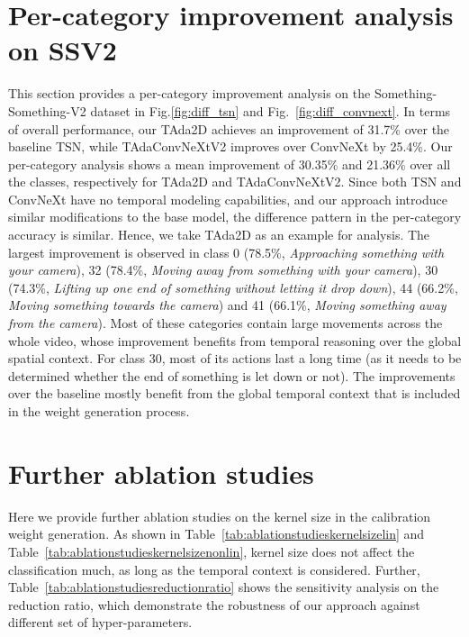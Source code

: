 \documentclass[10pt,journal,compsoc]{IEEEtran}
\begin{document}
\section{Per-category improvement analysis on SSV2}
\label{appendix:percategoryimprovement}
This section provides a per-category improvement analysis on the Something-Something-V2 dataset in Fig.\ref{fig:diff_tsn} and Fig.~\ref{fig:diff_convnext}.
In terms of overall performance, our TAda2D achieves an improvement of 31.7\% over the baseline TSN, while TAdaConvNeXtV2 improves over ConvNeXt by 25.4\%. 
Our per-category analysis shows a mean improvement of 30.35\% and 21.36\% over all the classes, respectively for TAda2D and TAdaConvNeXtV2. 
Since both TSN and ConvNeXt have no temporal modeling capabilities, and our approach introduce similar modifications to the base model, the difference pattern in the per-category accuracy is similar. 
Hence, we take TAda2D as an example for analysis.
The largest improvement is observed in class 0 (78.5\%, \textit{Approaching something with your camera}), 32 (78.4\%, \textit{Moving away from something with your camera}), 30 (74.3\%, \textit{Lifting up one end of something without letting it drop down}), 44 (66.2\%, \textit{Moving something towards the camera}) and 41 (66.1\%, \textit{Moving something away from the camera}).
Most of these categories contain large movements across the whole video, whose improvement benefits from temporal reasoning over the global spatial context. 
For class 30, most of its actions last a long time (as it needs to be determined whether the end of something is let down or not). The improvements over the baseline mostly benefit from the global temporal context that is included in the weight generation process. 



\section{Further ablation studies}
\label{appendix:ablation}
Here we provide further ablation studies on the kernel size in the calibration weight generation. As shown in Table~\ref{tab:ablationstudieskernelsizelin} and Table~\ref{tab:ablationstudieskernelsizenonlin}, kernel size does not affect the classification much, as long as the temporal context is considered. Further, Table~\ref{tab:ablationstudiesreductionratio} shows the sensitivity analysis on the reduction ratio, which demonstrate the robustness of our approach against different set of hyper-parameters. 
\end{document}

